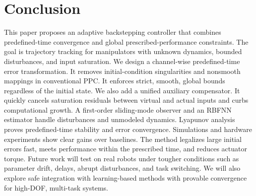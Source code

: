 \documentclass[pdflatex,sn-mathphys-num]{sn-jnl}%
\theoremstyle{thmstyleone}%
\theoremstyle{thmstyletwo}%
\theoremstyle{thmstylethree}%
\begin{document}
	

\section{Conclusion}



This paper proposes an adaptive backstepping controller that combines predefined-time convergence and global prescribed-performance constraints. The goal is trajectory tracking for manipulators with unknown dynamics, bounded disturbances, and input saturation. We design a channel-wise predefined-time error transformation. It removes initial-condition singularities and nonsmooth mappings in conventional PPC. It enforces strict, smooth, global bounds regardless of the initial state. We also add a unified auxiliary compensator. It quickly cancels saturation residuals between virtual and actual inputs and curbs computational growth. A first-order sliding-mode observer and an RBFNN estimator handle disturbances and unmodeled dynamics. Lyapunov analysis proves predefined-time stability and error convergence. Simulations and hardware experiments show clear gains over baselines. The method legalizes large initial errors fast, meets performance within the prescribed time, and reduces actuator torque. Future work will test on real robots under tougher conditions such as parameter drift, delays, abrupt disturbances, and task switching. We will also explore safe integration with learning-based methods with provable convergence for high-DOF, multi-task systems.
\end{document}
